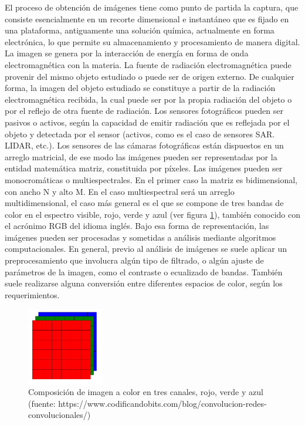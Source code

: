 El proceso de obtención de imágenes tiene como punto de partida la captura, que consiste esencialmente en un recorte dimensional e instantáneo que es fijado en una plataforma, antiguamente una solución química, actualmente en forma electrónica, lo que permite su almacenamiento y procesamiento de manera digital. La imagen se genera por la interacción de energía en forma de onda electromagnética con la materia. La fuente de radiación electromagnética puede provenir del mismo objeto estudiado o puede ser de origen externo. De cualquier forma, la imagen del objeto estudiado se constituye a partir de la radiación electromagnética recibida, la cual puede ser por la propia radiación del objeto o por el reflejo de otra fuente de radiación. Los sensores fotográficos pueden ser pasivos o activos, según la capacidad de emitir radiación que es reflejada por el objeto y detectada por el sensor (activos, como es el caso de sensores SAR. LIDAR, etc.). Los sensores de las cámaras fotográficas están dispuestos en un arreglo matricial, de ese modo las imágenes pueden ser representadas por la entidad matemática matriz, constituida por píxeles. Las imágenes pueden ser monocromáticas o multiespectrales. En el primer caso la matriz es bidimensional, con ancho N y alto M. En el caso multiespectral será un arreglo multidimensional, el caso más general es el que se compone de tres bandas de color en el espectro visible, rojo, verde y azul (ver figura \ref{RGB}), también conocido con el acrónimo RGB del idioma inglés. Bajo esa forma de representación, las imágenes pueden ser procesadas y sometidas a análisis mediante algoritmos computacionales. En general, previo al análisis de imágenes se suele aplicar un preprocesamiento que involucra algún tipo de filtrado, o algún ajuste de parámetros de la imagen, como el contraste o ecualizado de bandas. También suele realizarse alguna conversión entre diferentes espacios de color, según los requerimientos.\\

\begin{figure}[h!]
    \includegraphics[width=0.3\textwidth]{Imagenes/imagen-a-color.png}
     \caption{Composición de imagen a color en tres canales, rojo, verde y azul (fuente: https://www.codificandobits.com/blog/convolucion-redes-convolucionales/)}
    \label{RGB}
\end{figure}

